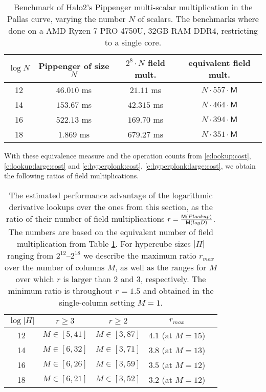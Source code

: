 \documentclass[11pt]{article}
\theoremstyle{definition}
\theoremstyle{remark}
\begin{document}
\begin{table}[h!]
\caption{%
Benchmark of Halo2's Pippenger multi-scalar multiplication in the Pallas curve, varying the number $N$ of scalars.
The benchmarks where done on a AMD Ryzen 7 PRO 4750U, 32GB RAM DDR4,  restricting to a single core.
}
\label{tab:pippenger}
\begin{center}
\begin{tabular}{|c|c|c|c|}
\hline
$\log N$ &  Pippenger of size $N$ & $2^8\cdot N$ field mult. & equivalent field mult.
\\\hline
12 & $46.010$ ms &  $21.11$ ms & $N\cdot 557\cdot \mathsf M$
\\
14 & $153.67$ ms & $42.315$ ms & $N\cdot 464 \cdot \mathsf M$
\\
16 & $522.13$ ms & $169.70$ ms & $N\cdot 394\cdot\mathsf M$
\\
18 &       $1.869$  ms  & $679.27$ ms & $N\cdot 351\cdot\mathsf M$
\\\hline
\end{tabular}
\end{center}
\end{table}

With these equivalence measure and the operation counts from  \eqref{e:lookup:cost}, \eqref{e:lookup:large:cost} and \eqref{e:hyperplonk:cost}, \eqref{e:hyperplonk:large:cost}, we obtain the following ratios of field multiplications.

\begin{table}[h!]
\caption{%
The estimated performance advantage of the logarithmic derivative lookups over the ones from this section, as the ratio of their number of field multiplications $r =\nicefrac{\mathsf M({Plookup})}{\mathsf M({logD})}$.
The numbers are based on the equivalent number of field multiplication from Table \ref{tab:pippenger}.
For hypercube sizes $|H|$ ranging from $2^{12}$--$2^{18}$ we describe the maximum ratio $r_{max}$ over the number of columns $M$, as well as the ranges for $M$ over which $r$ is larger than $2$ and $3$, respectively.
The minimum ratio is throughout $r= 1.5$ and obtained in the single-column setting $M=1$. 
}
\label{tab:comparison}
\vspace*{0.5cm}
\centering
\begin{tabular} {|c|c|c|c|c|}
\hline
$\log|H|$ & $r\geq 3$ & $r\geq 2$ & $r_{max}$ 
\\\hline
12 & $M\in [5, 41]$ & $M\in [3, 87]$ & $4.1$ (at $M =15$)
\\
14 & $M\in [6, 32]$ & $M\in [3, 71]$ & $3.8$ (at $M= 13$)
\\
16 & $M\in [6, 26]$  & $M\in [3, 59]$ & $3.5$ (at $M= 12$)
\\
18 & $M\in [6, 21]$  & $M\in [3, 52]$ & $3.2$ (at $M= 12$)
\\\hline
\end{tabular}
\end{table}
\end{document}
